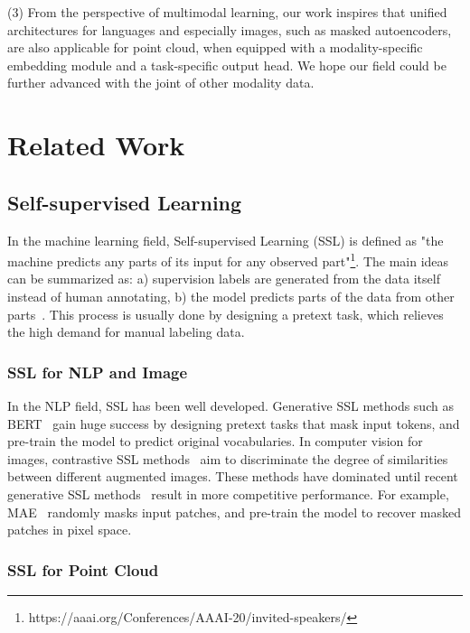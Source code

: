 \documentclass[runningheads]{llncs}
\begin{document}
(3) From the perspective of multimodal learning, our work inspires that unified architectures for languages and especially images, such as masked autoencoders, are also applicable for point cloud, when equipped with a modality-specific embedding module and a task-specific output head. We hope our field could be further advanced with the joint of other modality data.

\section{Related Work}



\subsection{Self-supervised Learning}
In the machine learning field, Self-supervised Learning (SSL) is defined as "the machine predicts any parts of its input for any observed part"\footnote{https://aaai.org/Conferences/AAAI-20/invited-speakers/}. The main ideas can be summarized as: a) supervision labels are generated from the data itself instead of human annotating, b) the model predicts parts of the data from other parts~\cite{ssl}. This process is usually done by designing a pretext task, which relieves the high demand for manual labeling data.


\subsubsection{SSL for NLP and Image}

In the NLP field, SSL has been well developed. Generative SSL methods such as BERT~\cite{bert} gain huge success by designing pretext tasks that mask input tokens, and pre-train the model to predict original vocabularies. In computer vision for images, contrastive SSL methods~\cite{cvcontrastive1,cvcontrastive2,cvcontrastive3,cvcontrastive4,cvcontrastive5} aim to discriminate the degree of similarities between different augmented images. These methods have dominated until recent generative SSL methods~\cite{mae,simmim,cvgenerative2} result in more competitive performance. For example, MAE~\cite{mae} randomly masks input patches, and pre-train the model to recover masked patches in pixel space.

\subsubsection{SSL for Point Cloud}
\end{document}
